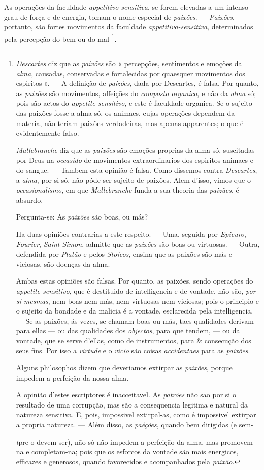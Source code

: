 As operações da faculdade \emph{appetitivo-sensitiva}, se forem elevadas a um intenso grau de força e de energia, tomam o nome especial de \emph{paixões}. --- \emph{Paixões}, portanto, são fortes movimentos da faculdade \emph{appetitivo-sensitiva}, determinados pela percepção do bem ou do mal \footnote{\emph{Descartes} diz que as \emph{paívões} são « percepções, sentimentos e emoções da \emph{alma}, causadas, conservadas e fortalecidas por quaesquer movimentos dos espiritos ». --- A definição de \emph{paízóes}, dada por Descartes, é falsa. Por quanto, as \emph{paixões} são movimentos, affeições do \emph{composto organico}, e não da \emph{alma} só; pois são actos do \emph{appetite sensitivo}, e este é faculdade organica. Se o sujeito das paixões fosse a alma só, os animaes, cujas operações dependem da materia, não teriam paixões verdadeiras, mas apenas apparentes; o que é evidentemente falso.\par \emph{Mallebranche} diz que as \emph{paixões} são emoções proprias da alma só, suscitadas por Deus na \emph{occasído} de movimentos extraordinarios dos espiritos animaes e do sangue. --- Tambem esta opinião é falsa. Como dissemos contra \emph{Descartes}, a \emph{alma}, por si só, não póde ser sujeito de paixões. Alem d'isso, vimos que o \emph{occasionalismo}, em que \emph{Mallebranche} funda a sua theoria das \emph{paizües}, é absurdo.\par Pergunta-se: As \emph{paixões} são boas, ou más?\par Ha duas opiniões contrarias a este respeito. --- Uma, seguida por \emph{Epicuro}, \emph{Fourier}, \emph{Saint-Simon}, admitte que as \emph{paixões} são boas ou virtuosas. --- Outra, defendida por \emph{Platão} e pelos \emph{Stoicos}, ensina que as paixões são más e viciosas, são doenças da alma.\par Ambas estas opiniões são falsas. Por quanto, as paixões, sendo operações do \emph{appetite sensitivo}, que é destituido de intelligencia e de vontade, não são, \emph{por si mesmas}, nem boas nem más, nem virtuosas nem viciosas; pois o principio e o sujeito da bondade e da malicia é a vontade, esclarecida pela intelligencia. --- Se as paixões, ás vezes, se chamam boas ou más, taes qualidades derivam para ellas --- ou das qualidades dos \emph{objectos}, para que tendem, --- ou da vontade, que se serve d'ellas, como de instrumentos, para \& consecução dos seus fins. Por isso a \emph{virtude} e o \emph{vicio} são coisas \emph{accidentaes} para as \emph{paixões}.\par Alguns philosophos dizem que deveriamos extirpar as \emph{paixões}, porque impedem a perfeição da nossa alma.\par A opinião d'estes escriptores é inacceitavel. As \emph{patrões} não sao por si o resultado de uma corrupção, mas são a consequencia legitima e natural da natureza sensitiva. E, pois, impossivel extirpal-as, como é impossivel extirpar a propria natureza. --- Além disso, as \emph{paéções}, quando bem dirigidas (e sem-\par \emph{t}pre o devem ser), não só não impedem a perfeição da alma, mas promovem-na e completam-na; pois que os esforcos da vontade são mais energicos, efficazes e generosos, quando favorecidos e acompanhados pela \emph{paixão}.}.

